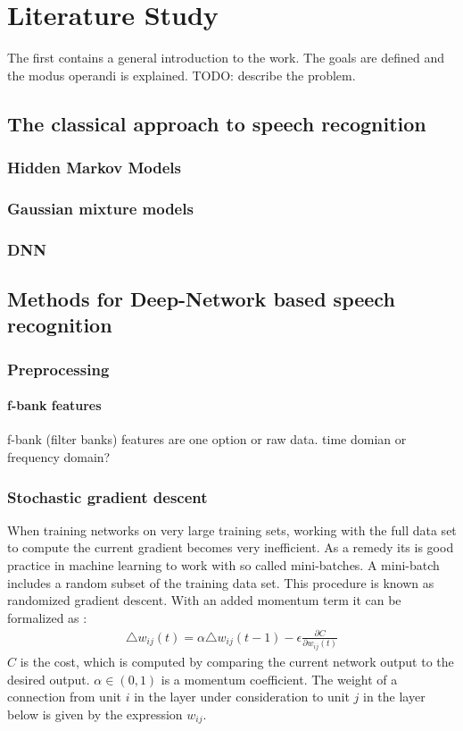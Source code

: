 \chapter{Literature Study}
\label{cha:intro}
The first contains a general introduction to the work. The goals are
defined and the modus operandi is explained.
TODO: describe the problem.


\section{The classical approach to speech recognition}
\subsection{Hidden Markov Models}

\subsection{Gaussian mixture models}

\subsection{DNN}


\section{Methods for Deep-Network based speech recognition}

\subsection{Preprocessing}

\subsubsection{f-bank features}
f-bank (filter banks) features are one option or raw data.
time domian or frequency domain?

\subsection{Stochastic gradient descent}
When training networks on very large training sets, working with the full data set to compute the current gradient becomes very inefficient. As a remedy its is good practice in machine learning to work with so called mini-batches. A mini-batch includes a random subset of the training data set. This procedure is known as randomized gradient descent. With an added momentum term it can be formalized as \cite[page 4]{Hinton2012}:
\begin{align}
\triangle w_{ij}(t) = \alpha \triangle w_{ij}(t-1) - \epsilon \frac{\partial C}{\partial w_{ij}(t)}
\end{align}
$C$ is the cost, which is computed by comparing the current network output to the desired output. $\alpha \in (0,1)$ is a momentum coefficient. The weight of a connection from unit $i$ in the layer under consideration to unit $j$ in the layer below is given by the expression $w_{ij}$.




